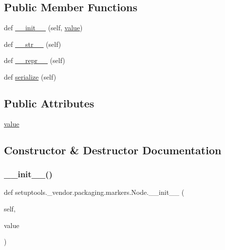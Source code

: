 \subsection*{Public Member Functions}
\begin{DoxyCompactItemize}
\item 
def \hyperlink{classsetuptools_1_1__vendor_1_1packaging_1_1markers_1_1Node_a37103996372a8c46d988766667be533f}{\+\_\+\+\_\+init\+\_\+\+\_\+} (self, \hyperlink{classsetuptools_1_1__vendor_1_1packaging_1_1markers_1_1Node_add7c503e0d7d38e590d471eb64d253a1}{value})
\item 
def \hyperlink{classsetuptools_1_1__vendor_1_1packaging_1_1markers_1_1Node_a0b68ab0418654f21f81deae293c40516}{\+\_\+\+\_\+str\+\_\+\+\_\+} (self)
\item 
def \hyperlink{classsetuptools_1_1__vendor_1_1packaging_1_1markers_1_1Node_ae26672290ba74cf2eda0c89e0527df22}{\+\_\+\+\_\+repr\+\_\+\+\_\+} (self)
\item 
def \hyperlink{classsetuptools_1_1__vendor_1_1packaging_1_1markers_1_1Node_a4684c86e08d0db1fc159e4ec983b3903}{serialize} (self)
\end{DoxyCompactItemize}
\subsection*{Public Attributes}
\begin{DoxyCompactItemize}
\item 
\hyperlink{classsetuptools_1_1__vendor_1_1packaging_1_1markers_1_1Node_add7c503e0d7d38e590d471eb64d253a1}{value}
\end{DoxyCompactItemize}


\subsection{Constructor \& Destructor Documentation}
\mbox{\label{classsetuptools_1_1__vendor_1_1packaging_1_1markers_1_1Node_a37103996372a8c46d988766667be533f}} 
\subsubsection{\texorpdfstring{\+\_\+\+\_\+init\+\_\+\+\_\+()}{\_\_init\_\_()}}
{\footnotesize\ttfamily def setuptools.\+\_\+vendor.\+packaging.\+markers.\+Node.\+\_\+\+\_\+init\+\_\+\+\_\+ (\begin{DoxyParamCaption}\item[{}]{self,  }\item[{}]{value }\end{DoxyParamCaption})}




